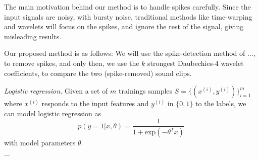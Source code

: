 The main motivation behind our method
is to handle spikes carefully.
Since the input signals are noisy, with bursty noise,
traditional methods like time-warping and wavelets
will focus on the spikes, and ignore the rest of the signal,
giving misleading results.

Our proposed method is as follows: 
We will use the spike-detection method of $\ldots$,
to remove spikes, and only then,  we use the $k$ strongest
Daubechies-4 wavelet coefficients, to compare the two (spike-removed)
sound clips.

\noindent
\textit{Logistic regression.} Given a set of $m$ trainings samples $S = \{ (x^{(i)}, y^{(i)}) \}_{i=1}^m$ where $x^{(i)}$ responds to the input features and $y^{(i)}$ in $\{ 0,1 \}$ to the labels, we can model logistic regression as
$$
p(y=1|x,\theta) = \frac{1}{1+\text{exp}(-\theta^T x)}
$$
with model parameters $\theta$.

$\ldots$

